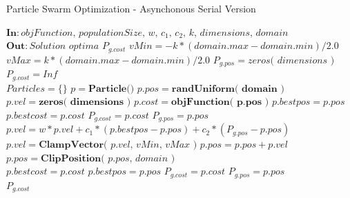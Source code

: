 \documentclass[journal]{IEEEtran}
\begin{document}
\begin{algorithm*}
    \caption{Particle Swarm Optimization - Asynchonous Serial Version}\label{alg:PSOcpu}
    \begin{algorithmic}[1]
        \State $\textbf{In}: \textit{objFunction, populationSize, w, $c_{1}$, $c_{2}$, k, dimensions, domain}$
        \State $\textbf{Out}: \textit{Solution optima } P_{g.cost}$
        \State $vMin = -k * ( domain.max - domain.min ) / 2.0$
        \State $vMax =  k * ( domain.max - domain.min ) / 2.0$
        \State $P_{g.pos} = \textit{zeros( dimensions )}$ 
        \State $P_{g.cost} = Inf$ 
        \\
        \State $Particles=\lbrace \rbrace$ 
         
            \State $p = \textbf{Particle()}$
            \State $p.pos = \textbf{randUniform( domain )}$
            \State $p.vel = \textbf{zeros( dimensions )}$
            \State $p.cost = \textbf{objFunction( p.pos )}$
            \State $p.bestpos = p.pos$
            \State $p.bestcost = p.cost$
                \State $P_{g.cost} = p.cost$
                \State $P_{g.pos} = p.pos$
            \EndIf
        \EndFor
        \\
         
                \State $p.vel = w * p.vel + 
                                c_{1} * ( p.bestpos - p.pos ) + 
                                c_{2} * ( P_{g.pos} - p.pos )$ 
                \State $p.vel = \textbf{ClampVector}\textit{( p.vel, vMin, vMax )}$
                \State $p.pos = p.pos + p.vel$ 
                \State $p.pos = \textbf{ClipPosition}\textit{( p.pos, domain )}$
                \\
                    \State $p.bestcost = p.cost$ 
                    \State $p.bestpos = p.pos$
                        \State $P_{g.cost} = p.cost$ 
                        \State $P_{g.pos} = p.pos$
                    \EndIf
                \EndIf
            \EndFor
        \EndWhile
        \\
        \Return $P_{g.cost}$
    \end{algorithmic}
\end{algorithm*}
\end{document}
